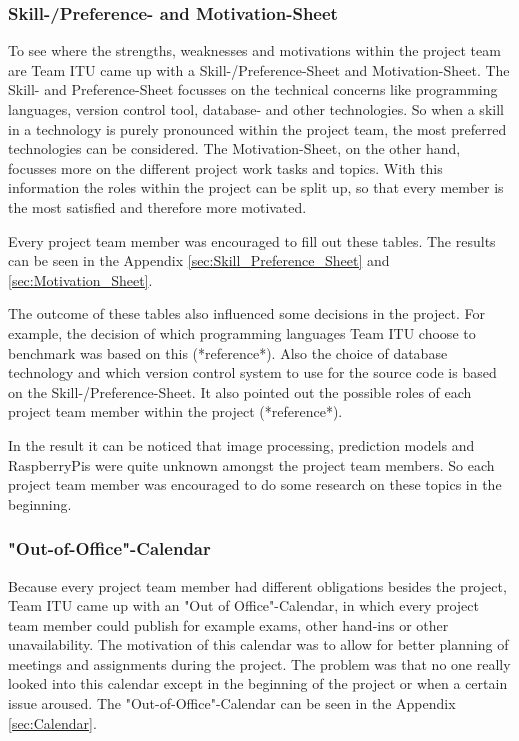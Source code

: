 \subsubsection {Skill-/Preference- and Motivation-Sheet}
To see where the strengths, weaknesses and motivations within the project team are Team ITU came up with a Skill-/Preference-Sheet and Motivation-Sheet. The Skill- and Preference-Sheet focusses on the technical concerns like programming languages, version control tool, database- and other technologies. So when a skill in a technology is purely pronounced within the project team, the most preferred technologies can be considered. The Motivation-Sheet, on the other hand, focusses more on the different project work tasks and topics. With this information the roles within the project can be split up, so that every member is the most satisfied and therefore more motivated.

Every project team member was encouraged to fill out these tables. The results can be seen in the Appendix \ref{sec:Skill_Preference_Sheet} and \ref{sec:Motivation_Sheet}.

The outcome of these tables also influenced some decisions in the project. For example, the decision of which programming languages Team ITU choose to benchmark was based on this (*reference*). Also the choice of database technology and which version control system to use for the source code is based on the Skill-/Preference-Sheet. It also pointed out the possible roles of each project team member within the project (*reference*).

In the result it can be noticed that image processing, prediction models and RaspberryPis were quite unknown amongst the project team members. So each project team member was encouraged to do some research on these topics in the beginning.

\subsubsection{"Out-of-Office"-Calendar}

Because every project team member had different obligations besides the project, Team ITU came up with an "Out of Office"-Calendar, in which every project team member could publish for example exams, other hand-ins or other unavailability. The motivation of this calendar was to allow for better planning of meetings and assignments during the project. The problem was that no one really looked into this calendar except in the beginning of the project or when a certain issue aroused. The "Out-of-Office"-Calendar can be seen in the Appendix \ref{sec:Calendar}.

